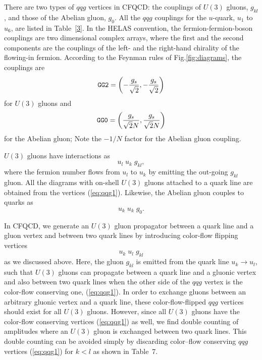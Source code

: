 There are two types of $qqg$ vertices in CFQCD: the couplings of $U(3)$
gluons, $g_{kl}$, and those of the Abelian gluon,
$g_0$. All the $qqg$ couplings for the $u$-quark, $u_1$ to $u_6$,  are
listed in Table~\ref{3}. In the HELAS convention, the
fermion-fermion-boson couplings are two dimensional complex arrays,
where the first and the second components are the couplings of the left-
and the right-hand chirality of the flowing-in fermion. According to the
Feynman rules of Fig.\ref{fig:diagrams}, the couplings are
\begin{equation}
{\tt GG2}=\left(-\frac{g_s}{\sqrt{2}},-\frac{g_s}{\sqrt{2}}\right)
 \end{equation}
 for $U(3)$ gluons and
 \begin{equation}
 {\tt GG0}=\left(\frac{g_s}{\sqrt{2}N},\frac{g_s}{\sqrt{2}N}\right)
  \end{equation}
  for the Abelian gluon; Note  the $-1/N$ factor for the Abelian gluon coupling.

$U(3)$ gluons have interactions as
\begin{equation}
 u_l\; u_k\; g_{kl},
  \label{eq:qqg1}
\end{equation}
 where the fermion number flows from $u_l$ to $u_k$ by emitting the out-going $g_{kl}$ gluon. All the diagrams with on-shell $U(3)$ gluons
 attached to a quark line are obtained from the vertices
 (\ref{eq:qqg1}). Likewise, the Abelian gluon couples to quarks as
\begin{equation}
 u_k\; u_k\; g_0.
\end{equation}

In CFQCD, we generate an $U(3)$ gluon propagator between a quark line and
a gluon vertex and between two quark lines by introducing color-flow
flipping vertices
\begin{equation}
 u_k\; u_l\; g_{kl}
  \label{eq:interaction2}
\end{equation}
as we discussed above. Here, the gluon $g_{kl}$ is emitted from the quark line
 $u_k\rightarrow u_l$, such that $U(3)$ gluons can propagate
 between a quark line and a gluonic vertex and also between
 two quark lines when the other side of the $qqg$ vertex is the
 color-flow conserving one, (\ref{eq:qqg1}). In order to exchange gluons between an arbitrary gluonic vertex and a quark line, these color-flow-flipped $qqg$ vertices should exist for all $U(3)$ gluons. However, since all $U(3)$ gluons have the color-flow conserving vertices (\ref{eq:qqg1}) as well, we find double counting of amplitudes where an $U(3)$ gluon is exchanged between two quark lines. This double counting can be avoided simply by discarding color--flow conserving $qqg$ vertices (\ref{eq:qqg1}) for $k<l$ as shown in Table~7. 

